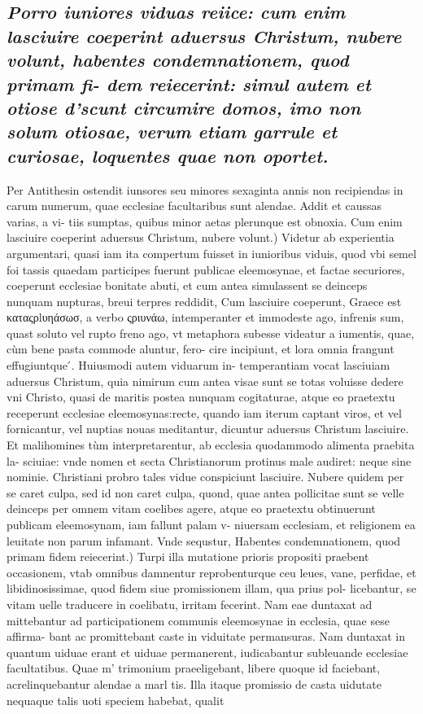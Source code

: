 \documentclass{article}
\begin{document}
\begin{pages}
\subsection*{\textit{Porro iuniores viduas reiice: cum enim lasciuire coeperint aduersus Christum, nubere volunt, habentes condemnationem, quod primam fi- dem reiecerint: simul autem et otiose d'scunt circumire domos, imo non solum otiosae, verum etiam garrule et curiosae, loquentes quae non oportet. }}\pstart Per Antithesin ostendit iunsores seu minores sexaginta annis non recipiendas in carum numerum, quae ecclesiae facultaribus sunt alendae. Addit et caussas varias, a vi- tiis sumptas, quibus minor aetas plerunque est obnoxia.  \pend\pstart Cum enim lasciuire coeperint aduersus Christum, nubere volunt.) Videtur ab experientia argumentari, quasi iam ita compertum fuisset in iunioribus viduis, quod vbi semel foi tassis quaedam participes fuerunt publicae eleemosynae, et factae securiores, coeperunt ecclesiae bonitate abuti, et cum antea simulassent se deinceps nunquam nupturas, breui terpres reddidit, Cum lasciuire coeperunt, Graece est καταςρlυηάσωσ, a verbo ςριυνάω, intemperanter et immodeste ago, infrenis sum, quast soluto vel rupto freno ago, vt metaphora subesse videatur a iumentis, quae, cùm bene pasta commode aluntur, fero- cire incipiunt, et lora omnia frangunt effugiuntque ́. Huiusmodi autem viduarum in- temperantiam vocat lasciuiam aduersus Christum, quia nimirum cum antea visae sunt se totas voluisse dedere vni Christo, quasi de maritis postea nunquam cogitaturae, atque  eo praetextu receperunt ecclesiae eleemosynas:recte, quando iam iterum captant viros, et vel fornicantur, vel nuptias nouas meditantur, dicuntur aduersus Christum lasciuire. Et malihomines tùm interpretarentur, ab ecclesia quodammodo alimenta praebita la- sciuiae: vnde nomen et secta Christianorum protinus male audiret: neque sine nominie. Christiani probro tales vidue conspiciunt lasciuire. Nubere quidem per se caret culpa, sed id non caret culpa, quond, quae antea pollicitae sunt se velle deinceps per omnem vitam coelibes agere, atque eo praetextu obtinuerunt publicam eleemosynam, iam fallunt palam v- niuersam ecclesiam, et religionem ea leuitate non parum infamant. Vnde sequstur,  \pend\pstart Habentes condemnationem, quod primam fidem reiecerint.) Turpi illa mutatione prioris propositi praebent occasionem, vtab omnibus damnentur reprobenturque ceu leues, vane, perfidae, et libidinosissimae, quod fidem siue promissionem illam, qua prius pol- licebantur, se vitam uelle traducere in coelibatu, irritam fecerint. Nam eae duntaxat ad mittebantur ad participationem communis eleemosynae in ecclesia, quae sese affirma- bant ac promittebant caste in viduitate permansuras. Nam duntaxat in quantum uiduae erant et uiduae permanerent, iudicabantur subleuande ecclesiae facultatibus. Quae m' trimonium praeeligebant, libere quoque id faciebant, acrelinquebantur alendae a marl tis. Illa itaque promissio de casta uidutate nequaque talis uoti speciem habebat, qualit  \pend

\end{pages}
\end{document}
